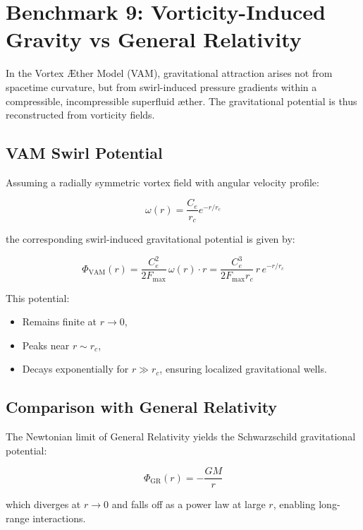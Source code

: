 \section{Benchmark 9: Vorticity-Induced Gravity vs General Relativity}

In the Vortex Æther Model (VAM), gravitational attraction arises not from spacetime curvature, but from swirl-induced pressure gradients within a compressible, incompressible superfluid æther. The gravitational potential is thus reconstructed from vorticity fields.

\subsection{VAM Swirl Potential}

Assuming a radially symmetric vortex field with angular velocity profile:

\begin{equation}
\omega(r) = \frac{C_e}{r_c} e^{-r/r_c}
\end{equation}

the corresponding swirl-induced gravitational potential is given by:

\begin{equation}
\Phi_{\text{VAM}}(r) = \frac{C_e^2}{2 F_{\text{max}}} \, \omega(r) \cdot r = \frac{C_e^3}{2 F_{\text{max}} r_c} \, r \, e^{-r/r_c}
\end{equation}

This potential:
\begin{itemize}
    \item Remains finite at \( r \to 0 \),
    \item Peaks near \( r \sim r_c \),
    \item Decays exponentially for \( r \gg r_c \), ensuring localized gravitational wells.
\end{itemize}

\subsection{Comparison with General Relativity}

The Newtonian limit of General Relativity yields the Schwarzschild gravitational potential:

\begin{equation}
\Phi_{\text{GR}}(r) = -\frac{G M}{r}
\end{equation}

which diverges at \( r \to 0 \) and falls off as a power law at large \( r \), enabling long-range interactions.

